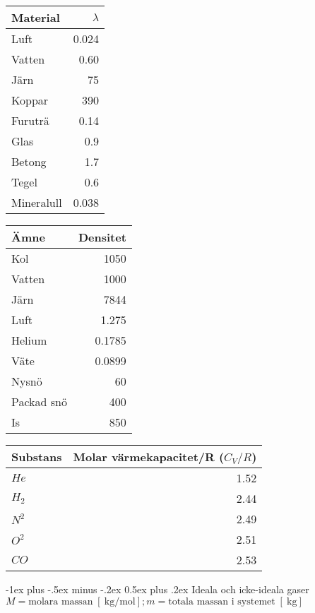 \documentclass[10pt,landscape]{article}
\makeatletter
\newcommand{\unit}[1]{
\;[\SI{}{#1}]
}
\renewcommand{\section}{\@startsection{section}{1}{0mm}%
                                {-1ex plus -.5ex minus -.2ex}%
                                {0.5ex plus .2ex}%
                                {\normalfont\large\bfseries}
                                }
\makeatother
\begin{document}
\begin{multicols}{3}
$$$$

\parbox{.40\linewidth}{
\begin{tabular}{l r}
Material & $\lambda$ \unit{\watt\per\meter\per\kelvin}\\
\hline
Luft & 0.024\\
Vatten & 0.60\\
Järn & 75\\
Koppar & 390\\
Furuträ & 0.14\\
Glas & 0.9\\
Betong & 1.7\\
Tegel & 0.6\\
Mineralull & 0.038\\
\end{tabular}
}
\;\;\;\;\;\;\;\;
\parbox{.40\linewidth}{
\begin{tabular}{l r}
Ämne & Densitet \unit{\kilogram\per\meter\cubed}\\
\hline
Kol & 1050\\
Vatten & 1000\\
Järn & 7844\\
Luft & 1.275\\
Helium & 0.1785\\
Väte & 0.0899\\
Nysnö & 60\\
Packad snö & 400\\
Is & 850\\
\end{tabular}
}


\begin{tabular}{l r }
Substans & Molar värmekapacitet/R ($C_V / R$)\\
\hline
$He$ & 1.52\\
$H_2$ & 2.44\\
$N^2$ & 2.49\\
$O^2$ & 2.51\\
$CO$ & 2.53\\
\end{tabular}

\section{Ideala och icke-ideala gaser}
$M = \text{molara massan} \unit{\kilogram\per\mol}; m = \text{totala massan i systemet} \unit{\kilogram}$


\end{multicols}
\end{document}
